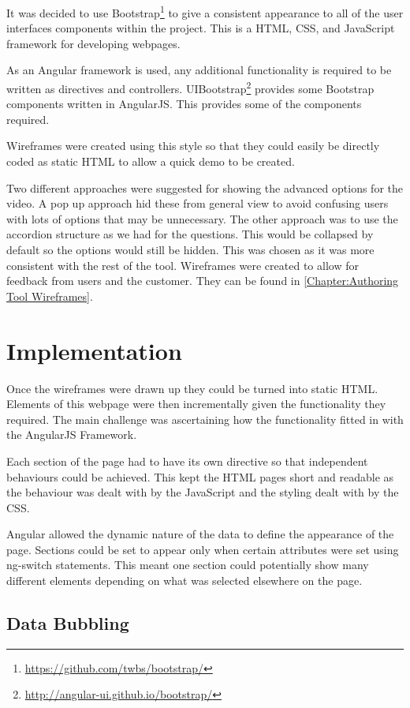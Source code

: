 It was decided to use Bootstrap\footnote{\url{https://github.com/twbs/bootstrap/}} to give a consistent appearance to all of the user interfaces components within the project. This is a HTML, \gls{CSS}, and JavaScript framework for developing webpages.

As an Angular framework is used, any additional functionality is required to be written as directives and controllers. UIBootstrap\footnote{\url{http://angular-ui.github.io/bootstrap/}} provides some Bootstrap components written in \gls{AngularJS}. This provides some of the components required. 

Wireframes were created using this style so that they could easily be directly coded as static HTML to allow a quick demo to be created. 

Two different approaches were suggested for showing the advanced options for the video. A pop up approach hid these from general view to avoid confusing users with lots of options that may be unnecessary. The other approach was to use the accordion structure as we had for the questions. This would be collapsed by default so the options would still be hidden. This was chosen as it was more consistent with the rest of the tool. Wireframes were created to allow for feedback from users and the customer. They can be found in \autoref{Chapter:Authoring Tool Wireframes}.

\section{Implementation}
\label{Section:Authoring_Implementation}
Once the wireframes were drawn up they could be turned into static HTML. Elements of this webpage were then incrementally given the functionality they required. The main challenge was ascertaining how the functionality fitted in with the \gls{AngularJS} Framework. 

Each section of the page had to have its own directive so that independent behaviours could be achieved. This kept the HTML pages short and readable as the behaviour was dealt with by the JavaScript and the styling dealt with by the \gls{CSS}.

Angular allowed the dynamic nature of the data to define the appearance of the page. Sections could be set to appear only when certain attributes were set using ng-switch statements. This meant one section could potentially show many different elements depending on what was selected elsewhere on the page.

\subsection{Data Bubbling}

